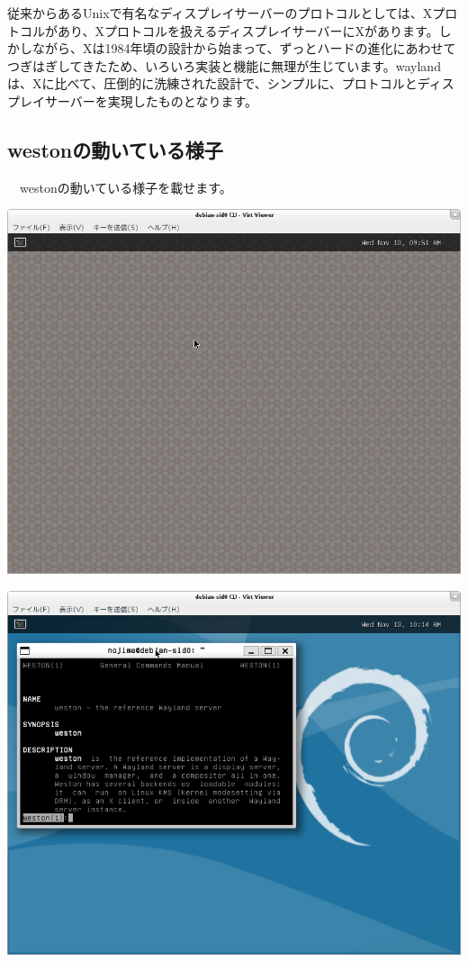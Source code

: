 \documentclass[mingoth,a4paper]{jsarticle}
\begin{document}
 従来からあるUnixで有名なディスプレイサーバーのプロトコルとしては、Xプロトコルがあり、Xプロトコルを扱えるディスプレイサーバーにXがあります。しかしながら、Xは1984年頃の設計から始まって、ずっとハードの進化にあわせてつぎはぎしてきたため、いろいろ実装と機能に無理が生じています。waylandは、Xに比べて、圧倒的に洗練された設計で、シンプルに、プロトコルとディスプレイサーバーを実現したものとなります\cite{real-wayland-X}。


\subsection{westonの動いている様子}

　westonの動いている様子を載せます。

\begin{minipage}{0.5\hsize}
\includegraphics[width=0.8\hsize]{image201311/weston-1st-launch.png}
\end{minipage}
\begin{minipage}{0.5\hsize}
\includegraphics[width=0.8\hsize]{image201311/weston-2nd-launch.png}
\end{minipage}
\end{document}
